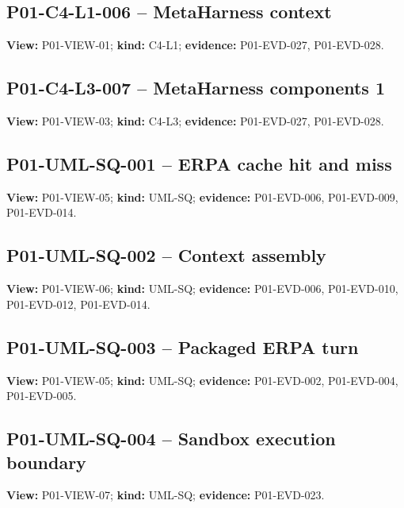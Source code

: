 \documentclass[10pt,letterpaper]{article}
\begin{document}
\subsection{P01-C4-L1-006 -- MetaHarness context}
\textbf{View:} P01-VIEW-01; \textbf{kind:} C4-L1; \textbf{evidence:} P01-EVD-027, P01-EVD-028.\par
{}
\clearpage

\subsection{P01-C4-L3-007 -- MetaHarness components 1}
\textbf{View:} P01-VIEW-03; \textbf{kind:} C4-L3; \textbf{evidence:} P01-EVD-027, P01-EVD-028.\par
{}
\clearpage

\subsection{P01-UML-SQ-001 -- ERPA cache hit and miss}
\textbf{View:} P01-VIEW-05; \textbf{kind:} UML-SQ; \textbf{evidence:} P01-EVD-006, P01-EVD-009, P01-EVD-014.\par
{}
\clearpage

\subsection{P01-UML-SQ-002 -- Context assembly}
\textbf{View:} P01-VIEW-06; \textbf{kind:} UML-SQ; \textbf{evidence:} P01-EVD-006, P01-EVD-010, P01-EVD-012, P01-EVD-014.\par
{}
\clearpage

\subsection{P01-UML-SQ-003 -- Packaged ERPA turn}
\textbf{View:} P01-VIEW-05; \textbf{kind:} UML-SQ; \textbf{evidence:} P01-EVD-002, P01-EVD-004, P01-EVD-005.\par
{}
\clearpage

\subsection{P01-UML-SQ-004 -- Sandbox execution boundary}
\textbf{View:} P01-VIEW-07; \textbf{kind:} UML-SQ; \textbf{evidence:} P01-EVD-023.\par
{}
\clearpage
\end{document}
